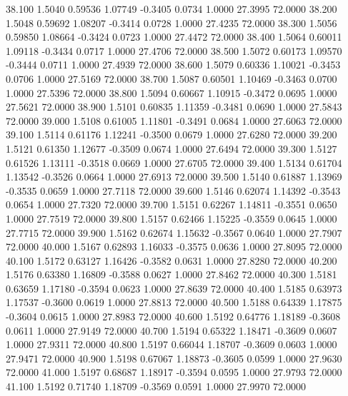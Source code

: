   38.100   1.5040   0.59536   1.07749  -0.3405   0.0734   1.0000  27.3995  72.0000
  38.200   1.5048   0.59692   1.08207  -0.3414   0.0728   1.0000  27.4235  72.0000
  38.300   1.5056   0.59850   1.08664  -0.3424   0.0723   1.0000  27.4472  72.0000
  38.400   1.5064   0.60011   1.09118  -0.3434   0.0717   1.0000  27.4706  72.0000
  38.500   1.5072   0.60173   1.09570  -0.3444   0.0711   1.0000  27.4939  72.0000
  38.600   1.5079   0.60336   1.10021  -0.3453   0.0706   1.0000  27.5169  72.0000
  38.700   1.5087   0.60501   1.10469  -0.3463   0.0700   1.0000  27.5396  72.0000
  38.800   1.5094   0.60667   1.10915  -0.3472   0.0695   1.0000  27.5621  72.0000
  38.900   1.5101   0.60835   1.11359  -0.3481   0.0690   1.0000  27.5843  72.0000
  39.000   1.5108   0.61005   1.11801  -0.3491   0.0684   1.0000  27.6063  72.0000
  39.100   1.5114   0.61176   1.12241  -0.3500   0.0679   1.0000  27.6280  72.0000
  39.200   1.5121   0.61350   1.12677  -0.3509   0.0674   1.0000  27.6494  72.0000
  39.300   1.5127   0.61526   1.13111  -0.3518   0.0669   1.0000  27.6705  72.0000
  39.400   1.5134   0.61704   1.13542  -0.3526   0.0664   1.0000  27.6913  72.0000
  39.500   1.5140   0.61887   1.13969  -0.3535   0.0659   1.0000  27.7118  72.0000
  39.600   1.5146   0.62074   1.14392  -0.3543   0.0654   1.0000  27.7320  72.0000
  39.700   1.5151   0.62267   1.14811  -0.3551   0.0650   1.0000  27.7519  72.0000
  39.800   1.5157   0.62466   1.15225  -0.3559   0.0645   1.0000  27.7715  72.0000
  39.900   1.5162   0.62674   1.15632  -0.3567   0.0640   1.0000  27.7907  72.0000
  40.000   1.5167   0.62893   1.16033  -0.3575   0.0636   1.0000  27.8095  72.0000
  40.100   1.5172   0.63127   1.16426  -0.3582   0.0631   1.0000  27.8280  72.0000
  40.200   1.5176   0.63380   1.16809  -0.3588   0.0627   1.0000  27.8462  72.0000
  40.300   1.5181   0.63659   1.17180  -0.3594   0.0623   1.0000  27.8639  72.0000
  40.400   1.5185   0.63973   1.17537  -0.3600   0.0619   1.0000  27.8813  72.0000
  40.500   1.5188   0.64339   1.17875  -0.3604   0.0615   1.0000  27.8983  72.0000
  40.600   1.5192   0.64776   1.18189  -0.3608   0.0611   1.0000  27.9149  72.0000
  40.700   1.5194   0.65322   1.18471  -0.3609   0.0607   1.0000  27.9311  72.0000
  40.800   1.5197   0.66044   1.18707  -0.3609   0.0603   1.0000  27.9471  72.0000
  40.900   1.5198   0.67067   1.18873  -0.3605   0.0599   1.0000  27.9630  72.0000
  41.000   1.5197   0.68687   1.18917  -0.3594   0.0595   1.0000  27.9793  72.0000
  41.100   1.5192   0.71740   1.18709  -0.3569   0.0591   1.0000  27.9970  72.0000
